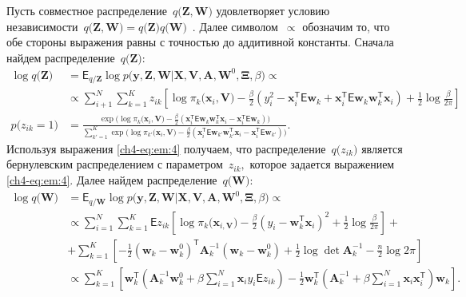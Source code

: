 Пусть совместное распределение~$q\bigr(\mathbf{Z}, \mathbf{W}\bigr)$ удовлетворяет условию независимости~$q\bigr(\mathbf{Z}, \mathbf{W}\bigr) = q\bigr(\mathbf{Z}\bigr)q\bigr(\mathbf{W}\bigr)$~\cite{bishop2006}. 
Далее символом~$\propto$ обозначим то, что обе стороны выражения равны с точностью до аддитивной константы.
Сначала найдем распределение~$q\bigr(\textbf{Z}\bigr)$:
\[
\label{ch4-eq:em:4}
\begin{aligned}
\log q\bigr(\textbf{Z}\bigr) &= \mathsf{E}_{q/\textbf{Z}} \log p\bigr(\mathbf{y}, \mathbf{Z}, \mathbf{W}|\mathbf{X}, \mathbf{V}, \textbf{A}, \textbf{W}^{0}, \bm{\Xi}, \beta\bigr)  \propto\\
&\propto \sum_{i+1}^{N}\sum_{k=1}^{K}z_{ik}\left[\log\pi_{k}\bigr(\textbf{x}_{i}, \textbf{V}\bigr) - \frac{\beta}{2}\left(y_{i}^{2} -\textbf{x}_{i}^{\mathsf{T}}\mathsf{E}\textbf{w}_{k} + \textbf{x}_{i}^{\mathsf{T}}\mathsf{E}\textbf{w}_{k}\textbf{w}_{k}^{\mathsf{T}}\textbf{x}_{i}\right) + \frac{1}{2}\log\frac{\beta}{2\pi}\right]\\
p\bigr(z_{ik} = 1\bigr) &= \frac{\exp\bigr(\log\pi_{k}\bigr(\textbf{x}_{i}, \textbf{V}\bigr) - \frac{\beta}{2}\left(\textbf{x}_{i}^{\mathsf{T}}\mathsf{E}\textbf{w}_{k}\textbf{w}_{k}^{\mathsf{T}}\textbf{x}_{i} - \textbf{x}_{i}^{\mathsf{T}}\mathsf{E}\textbf{w}_{k}\right)\bigr)}{\sum_{k'=1}^{K}\exp\bigr(\log\pi_{k'}\bigr(\textbf{x}_{i}, \textbf{V}\bigr) - \frac{\beta}{2}\left(\textbf{x}_{i}^{\mathsf{T}}\mathsf{E}\textbf{w}_{k'}\textbf{w}_{k'}^{\mathsf{T}}\textbf{x}_{i} - \textbf{x}_{i}^{\mathsf{T}}\mathsf{E}\textbf{w}_{k'}\right)\bigr)}.
\end{aligned}
\]
Используя выражения \eqref{ch4-eq:em:4} получаем, что распределение~$q\bigr(z_{ik}\bigr)$ является бернулевским распределением с параметром~$z_{ik},$ которое задается выражением \eqref{ch4-eq:em:4}.
Далее найдем распределение~$q\bigr(\textbf{W}\bigr)$:
\[
\label{ch4-eq:em:5}
\begin{aligned}
\log q\bigr(\textbf{W}\bigr) &= \mathsf{E}_{q/\textbf{W}}\log p\bigr(\mathbf{y}, \mathbf{Z}, \mathbf{W}|\mathbf{X}, \mathbf{V}, \textbf{A}, \textbf{W}^{0}, \bm{\Xi}, \beta\bigr) \propto\\
&\propto \sum_{i=1}^{N}\sum_{k=1}^{K}\mathsf{E}z_{ik}\left[\log\pi_{k}\bigr(\textbf{x}_{i, \textbf{V}}\bigr) - \frac{\beta}{2}\left(y_{i} - \textbf{w}_{k}^{\mathsf{T}}\textbf{x}_{i}\right)^{2} + \frac{1}{2}\log\frac{\beta}{2\pi}\right] + \\
&+ \sum_{k=1}^{K}\left[-\frac{1}{2}\left(\textbf{w}_{k} - \textbf{w}_{k}^{0}\right)^{\mathsf{T}}\textbf{A}_{k}^{-1}\left(\textbf{w}_{k} - \textbf{w}_{k}^{0}\right) + \frac{1}{2}\log\det\textbf{A}^{-1}_{k} - \frac{n}{2}\log2\pi\right] \\
&\propto \sum_{k=1}^{K}\left[\textbf{w}_{k}^{\mathsf{T}}\left(\textbf{A}_{k}^{-1}\textbf{w}_{k}^{0}+\beta\sum_{i=1}^{N}\textbf{x}_{i}y_{i}\mathsf{E}z_{ik}\right)-\frac{1}{2}\textbf{w}_{k}^{\mathsf{T}}\left(\textbf{A}_{k}^{-1}+\beta\sum_{i=1}^{N}\textbf{x}_{i}\textbf{x}_{i}^{\mathsf{T}}\right)\textbf{w}_{k}\right].
\end{aligned}
\]
